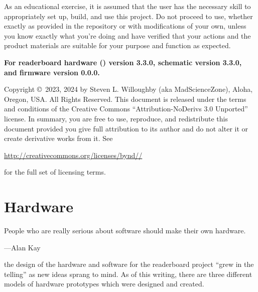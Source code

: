 As an educational exercise, it is assumed that the user has the necessary skill to appropriately set up, build,
and use this project. Do not proceed to use, whether exactly as provided in the repository or with modifications
of your own, unless you know exactly what you're doing and have verified that your actions and the product
materials are suitable for your purpose and function as expected.

\strut\vfill

\begin{center}\bfseries
	For readerboard hardware () version 3.3.0, schematic version 3.3.0, and firmware version 0.0.0.
\end{center}

\strut\vfill

\noindent Copyright \copyright\ 2023, 2024 by Steven L. Willoughby
(aka MadScienceZone), Aloha, Oregon, USA. All Rights Reserved.
This document is released under the terms and conditions of the
Creative Commons ``Attribution-NoDerivs 3.0 Unported'' license.
In summary, you are free to use, reproduce, and redistribute this 
document provided you give full attribution to its author and do not
alter it or create derivative works from it.  See
\begin{center}
\href{http://creativecommons.org/licenses/by-nd-3.0}{http://creativecommons.org/licenses/by\-nd\-//} 
\end{center}
for the full set of licensing terms.

\begin{center}
\end{center}

\newpage
\tableofcontents
\newpage
\listoffigures
\listoftables
\mainmatter

%
\chapter{Hardware}
\epigraph{People who are really serious about software should make their own hardware.}{---Alan Kay}
 the design of the hardware and software for the read\-erboard
project ``grew in the telling'' as new ideas sprang to mind. As of this writing, there are three
different models of hardware prototypes which were designed and created.

